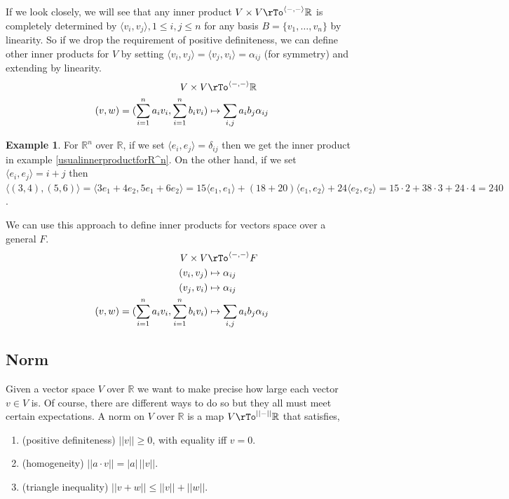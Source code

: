 \documentclass[12pt]{amsart}
\theoremstyle{definition}
\newtheorem{example}[theorem]{Example}
\begin{document}
If we look closely, we will see that any inner product $V \times V \rTo^{\langle - , - \rangle} \mathbb{R}$ is completely determined by $\langle v_i, v_j \rangle, 1 \leq i, j \leq n$ for any basis $B = \{v_1, \dots, v_n\}$ by linearity. So if we drop the requirement of positive definiteness, we can define other inner products for $V$ by setting $\langle v_i, v_j \rangle = \langle v_j, v_i \rangle = \alpha_{ij}$ (for symmetry) and extending by linearity.
\begin{align*}
V \times V & \rTo^{\langle - , - \rangle} \mathbb{R} \\
(v, w) = (\sum\limits_{i = 1}^n a_i v_i, \sum\limits_{i=1}^n b_i v_i) & \mapsto \sum\limits_{i, j} a_i b_j \alpha_{ij}
\end{align*}

\begin{example}\label{otherinnerproductforR^n} For $\mathbb{R}^n$ over $\mathbb{R}$, if we set $\langle e_i, e_j \rangle = \delta_{ij}$ then we get the inner product in example \ref{usualinnerproductforR^n}. On the other hand, if we set $\langle e_i, e_j \rangle = i + j$ then $\langle (3,4), (5,6) \rangle = \langle 3e_1 + 4e_2, 5e_1 + 6e_2 \rangle = 15\langle e_1, e_1 \rangle + (18 + 20)\langle e_1, e_2 \rangle + 24\langle e_2, e_2 \rangle = 15 \cdot 2 + 38 \cdot 3 + 24 \cdot 4 = 240$.
\end{example}

We can use this approach to define inner products for vectors space over a general $F$.
\begin{align*}
V \times V & \rTo^{\langle - , - \rangle} F\\
(v_i, v_j) & \mapsto \alpha_{ij}\\
(v_j, v_i) & \mapsto \alpha_{ij}\\
(v, w) = (\sum\limits_{i = 1}^n a_i v_i, \sum\limits_{i=1}^n b_i v_i) & \mapsto \sum\limits_{i, j} a_i b_j \alpha_{ij}
\end{align*}

\subsection{Norm} Given a vector space $V$ over $\mathbb{R}$ we want to make precise how large each vector $v \in V$ is. Of course, there are different ways to do so but they all must meet certain expectations.
\dfn A norm on $V$ over $\mathbb{R}$ is a map $V \rTo^{|| - ||} \mathbb{R}$ that satisfies,
\begin{enumerate}[\indent 1.]
\item (positive definiteness) $||v|| \geq 0$, with equality iff $v = 0$.
\item (homogeneity) $|| a \cdot v || = |a| \, || v ||$.
\item (triangle inequality) $|| v + w || \leq ||v|| + ||w||$.
\end{enumerate}
\end{document}
